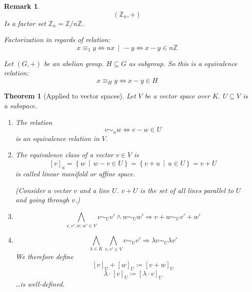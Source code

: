 \documentclass[a4paper,landscape,twocolumn]{article}
\newcommand\setdef[2]{\left\{#1\,\middle|\,#2\right\}}
\newcommand\divides[2]{#1\,\mid\,#2}
\newtheorem{theorem}{Theorem}
\newtheorem{rem}{Remark}
\begin{document}
\begin{rem}
  \[ \left(\mathbb Z_n, +\right) \]
  Is a factor set $\mathbb Z_n = \mathbb Z / n\mathbb Z$.

  Factorization in regards of relation:
  \[ x \equiv_1 y \Leftrightarrow n \divides x - y \Leftrightarrow x-y \in n\mathbb Z \]

  Let $(G, +)$ be an abelian group. $H \subseteq G$ as subgroup.
  So this is a equivalence relation:
  \[ x \equiv_H y \Leftrightarrow x - y \in H \]
\end{rem}

\begin{theorem}[Applied to vector spaces]
  \label{satz-4-21}
  Let $V$ be a vector space over $K$. $U \subseteq V$ is a subspace.

  \begin{enumerate}
    \item
      The relation
      \[ v \sim_u w \Leftrightarrow v - w \in U \]
      is an equivalence relation in $V$.
    \item
      The equivalence class of a vector $v \in V$ is
      \[ [v]_u = \setdef{w}{w -v \in U} = \setdef{v+u}{u \in U} = v + U \]
      is called \emph{linear manifold} or \emph{affine space}.

      (Consider a vector $v$ and a line $U$. $v + U$ is the set of all lines parallel to $U$ and going through $v$.)
    \item
      \[ \bigwedge_{v,v',w,w' \in V} v \sim_U v' \land w \sim_U w' \Rightarrow v+w \sim_U v' + w' \]
    \item
      \[ \bigwedge_{\lambda \in K} \bigwedge_{v,v' \in V} v \sim_U v' \Rightarrow \lambda v \sim_U \lambda v' \]
      We therefore define
      \[ [v]_U + [w]_U \coloneqq [v + w]_U \]
      \[ \lambda \cdot [v]_U \coloneqq [\lambda \cdot v]_U \]
      \dots is well-defined.
  \end{enumerate}
\end{theorem}
\end{document}
